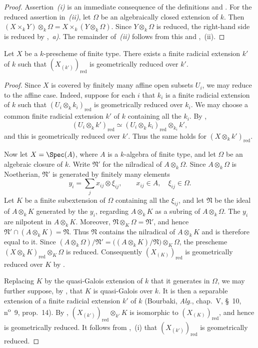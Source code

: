\begin{proof}
Assertion~\emph{(i)} is an immediate consequence of the definitions
and .
For the reduced assertion in~\emph{(ii)}, let $\Omega$ be an
algebraically closed extension of $k$.
Then $(X\times_k Y)\otimes_k\Omega=X\times_k(Y\otimes_k\Omega)$.
Since $Y\otimes_k\Omega$ is reduced, the right-hand side is reduced by
,~\emph{a)}.
The remainder of~\emph{(ii)} follows from this and
,~(ii).
\end{proof}

\begin{proposition}[4.6.6]
\label{IV.4.6.6}
Let $X$ be a $k$-prescheme of finite type.
There exists a finite radicial extension $k'$ of $k$ such that
$(X_{(k')})_{\mathrm{red}}$ is geometrically reduced over $k'$.
\end{proposition}

\begin{proof}
Since $X$ is covered by finitely many affine open subsets $U_i$, we
may reduce to the affine case.
Indeed, suppose for each $i$ that $k_i$ is a finite radicial extension
of $k$ such that
$(U_i\otimes_k k_i)_{\mathrm{red}}$ is geometrically reduced over
$k_i$.
We may choose a common finite radicial extension $k'$ of $k$ containing
all the $k_i$.
By ,
\[
 (U_i\otimes_k k')_{\mathrm{red}}
 \simeq
 (U_i\otimes_k k_i)_{\mathrm{red}}\otimes_{k_i}k',
\]
and this is geometrically reduced over $k'$.
Thus the same holds for $(X\otimes_k k')_{\mathrm{red}}$.

Now let $X=\Spec(A)$, where $A$ is a $k$-algebra of finite type, and
let $\Omega$ be an algebraic closure of $k$.
Write $\mathfrak N'$ for the nilradical of $A\otimes_k\Omega$.
Since $A\otimes_k\Omega$ is Noetherian, $\mathfrak N'$ is generated by
finitely many elements
\[
 y_i=\sum_j x_{ij}\otimes\xi_{ij},
 \qquad x_{ij}\in A,\quad \xi_{ij}\in\Omega.
\]
Let $K$ be a finite subextension of $\Omega$ containing all the
$\xi_{ij}$, and let $\mathfrak N$ be the ideal of $A\otimes_kK$
generated by the $y_i$, regarding $A\otimes_kK$ as a subring of
$A\otimes_k\Omega$.
The $y_i$ are nilpotent in $A\otimes_kK$.
Moreover,
$\mathfrak N\otimes_K\Omega=\mathfrak N'$, and hence $\mathfrak N'\cap(A\otimes_kK)=\mathfrak N$.
Thus $\mathfrak N$ contains the nilradical of $A\otimes_kK$ and is
therefore equal to it.
Since $(A\otimes_k\Omega)/\mathfrak N'
=\bigl((A\otimes_k K)/\mathfrak N\bigr)\otimes_K\Omega$,
the prescheme
$(X\otimes_kK)_{\mathrm{red}}\otimes_K\Omega$ is reduced.
Consequently $(X_{(K)})_{\mathrm{red}}$ is geometrically reduced over
$K$ by .

Replacing $K$ by the quasi-Galois extension of $k$ that it generates
in $\Omega$, we may further suppose, by , that $K$ is
quasi-Galois over $k$.
It is then a separable extension of a finite radicial extension $k'$
of $k$ (Bourbaki, \emph{Alg.}, chap.~V, \S~10,
n\textsuperscript{o}~9, prop.~14).
By ,
$(X_{(k')})_{\mathrm{red}}\otimes_{k'}K$ is isomorphic to
$(X_{(K)})_{\mathrm{red}}$, and hence is geometrically reduced.
It follows from ,~(i) that
$(X_{(k')})_{\mathrm{red}}$ is geometrically reduced.
\end{proof}

